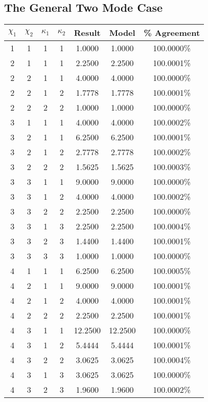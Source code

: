 \documentclass[11pt,a4paper]{article}
\numberwithin{equation}{section}
\begin{document}
\begin{appendices}
	\subsection{The General Two Mode Case}
	\label{sec:twomodetable}
		\begin{center}
		\begin{tabular}{cccc|cc|c}
			$\chi_1$ & $\chi_2$ & $\kappa_1$ & $\kappa_2$ & Result & Model & \% Agreement \\
			\hline
			1 & 1 & 1 & 1 & 1.0000 & 1.0000 & 100.0000\% \\
			2 & 1 & 1 & 1 & 2.2500 & 2.2500 & 100.0001\% \\
			2 & 2 & 1 & 1 & 4.0000 & 4.0000 & 100.0000\% \\
			2 & 2 & 1 & 2 & 1.7778 & 1.7778 & 100.0001\% \\
			2 & 2 & 2 & 2 & 1.0000 & 1.0000 & 100.0000\% \\
			3 & 1 & 1 & 1 & 4.0000 & 4.0000 & 100.0002\% \\
			3 & 2 & 1 & 1 & 6.2500 & 6.2500 & 100.0001\% \\
			3 & 2 & 1 & 2 & 2.7778 & 2.7778 & 100.0002\% \\
			3 & 2 & 2 & 2 & 1.5625 & 1.5625 & 100.0003\% \\
			3 & 3 & 1 & 1 & 9.0000 & 9.0000 & 100.0000\% \\
			3 & 3 & 1 & 2 & 4.0000 & 4.0000 & 100.0002\% \\
			3 & 3 & 2 & 2 & 2.2500 & 2.2500 & 100.0000\% \\
			3 & 3 & 1 & 3 & 2.2500 & 2.2500 & 100.0004\% \\
			3 & 3 & 2 & 3 & 1.4400 & 1.4400 & 100.0001\% \\
			3 & 3 & 3 & 3 & 1.0000 & 1.0000 & 100.0000\% \\
			4 & 1 & 1 & 1 & 6.2500 & 6.2500 & 100.0005\% \\
			4 & 2 & 1 & 1 & 9.0000 & 9.0000 & 100.0001\% \\
			4 & 2 & 1 & 2 & 4.0000 & 4.0000 & 100.0001\% \\
			4 & 2 & 2 & 2 & 2.2500 & 2.2500 & 100.0001\% \\
			4 & 3 & 1 & 1 & 12.2500 & 12.2500 & 100.0000\% \\
			4 & 3 & 1 & 2 & 5.4444 & 5.4444 & 100.0001\% \\
			4 & 3 & 2 & 2 & 3.0625 & 3.0625 & 100.0004\% \\
			4 & 3 & 1 & 3 & 3.0625 & 3.0625 & 100.0000\% \\
			4 & 3 & 2 & 3 & 1.9600 & 1.9600 & 100.0002\% \\

\end{tabular}
\end{center}
\end{appendices}
\end{document}
